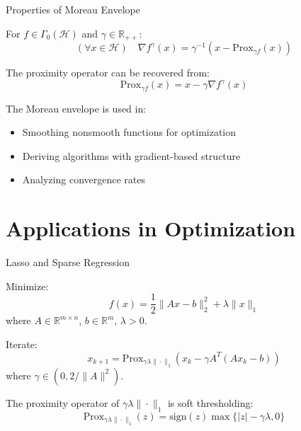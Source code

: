 \documentclass[aspectratio=169,10pt]{beamer}
\begin{document}
\begin{frame}{Properties of Moreau Envelope}
\begin{theorem}
For $f \in \Gamma_0(\mathcal{H})$ and $\gamma \in \mathbb{R}_{++}$:
\[
(\forall x \in \mathcal{H})\quad \nabla f^\gamma(x) = \gamma^{-1}(x - \mathrm{Prox}_{\gamma f}(x))
\]
\end{theorem}

\vspace{0.3cm}

\begin{corollary}
The proximity operator can be recovered from:
\[
\mathrm{Prox}_{\gamma f}(x) = x - \gamma \nabla f^\gamma(x)
\]
\end{corollary}

\vspace{0.3cm}

\begin{application}
The Moreau envelope is used in:
\begin{itemize}
    \item Smoothing nonsmooth functions for optimization
    \item Deriving algorithms with gradient-based structure
    \item Analyzing convergence rates
\end{itemize}
\end{application}
\end{frame}

\section{Applications in Optimization}

\begin{frame}{Lasso and Sparse Regression}
\begin{problem}
Minimize:
\[
f(x) = \frac{1}{2}\|Ax - b\|_2^2 + \lambda\|x\|_1
\]
where $A \in \mathbb{R}^{m \times n}$, $b \in \mathbb{R}^m$, $\lambda > 0$.
\end{problem}

\vspace{0.3cm}

\begin{solution}
Iterate:
\[
x_{k+1} = \mathrm{Prox}_{\gamma \lambda \|\cdot\|_1}(x_k - \gamma A^T(Ax_k - b))
\]
where $\gamma \in (0, 2/\|A\|^2)$.
\end{solution}

\vspace{0.3cm}

The proximity operator of $\gamma\lambda\|\cdot\|_1$ is soft thresholding:
\[
\mathrm{Prox}_{\gamma\lambda\|\cdot\|_1}(z) = \text{sign}(z) \max\{|z| - \gamma\lambda, 0\}
\]
\end{frame}
\end{document}
